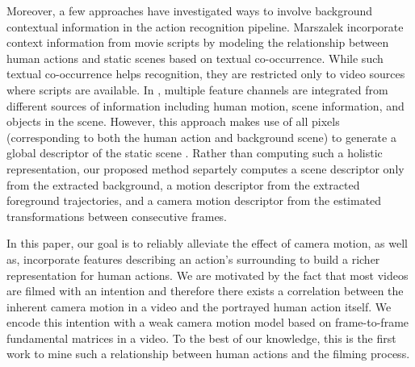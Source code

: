 Moreover, a few approaches have investigated ways to involve background contextual information in the action recognition pipeline. Marszalek \etal \cite{marszalek2009} incorporate context information from movie scripts by modeling the relationship between human actions and static scenes based on textual co-occurrence. While such textual co-occurrence helps recognition, they are restricted only to video sources where scripts are available. In \cite{ikizler2010}, multiple feature channels are integrated from different sources of information including human motion, scene information, and objects in the scene. However, this approach makes use of all pixels (corresponding to both the human action and background scene) to generate a global descriptor of the static scene \cite{oliva2001}. Rather than computing such a holistic representation, our proposed method separtely computes a scene descriptor only from the extracted background, a motion descriptor from the extracted foreground trajectories, and a camera motion descriptor from the estimated transformations between consecutive frames.

In this paper, our goal is to reliably alleviate the effect of camera motion, as well as, incorporate features describing an action's surrounding to build a richer representation for human actions. We are motivated by the fact that most videos are filmed with an intention and therefore there exists a correlation between the inherent camera motion in a video and the portrayed human action itself. We encode this intention with a weak camera motion model based on frame-to-frame fundamental matrices in a video. To the best of our knowledge, this is the first work to mine such a relationship between human actions and the filming process.








